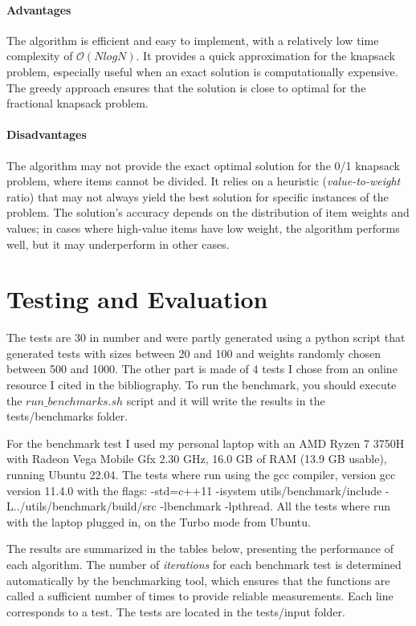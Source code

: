 \documentclass{llncs}
\begin{document}
\paragraph{Advantages}
The algorithm is efficient and easy to implement, with a relatively low time complexity of 
$\mathcal{O}(NlogN)$. It provides a quick approximation for the knapsack problem, especially useful
when an exact solution is computationally expensive. The greedy approach ensures that the solution
is close to optimal for the fractional knapsack problem.

\paragraph{Disadvantages}
The algorithm may not provide the exact optimal solution for the 0/1 knapsack problem, where items
cannot be divided. It relies on a heuristic (\textit{value-to-weight} ratio) that may not always
yield the best solution for specific instances of the problem. The solution's accuracy depends on 
the distribution of item weights and values; in cases where high-value items have low weight, the 
algorithm performs well, but it may underperform in other cases.

\section{Testing and Evaluation}
The tests are 30 in number and were partly generated using a python script that generated tests with
sizes between 20 and 100 and weights randomly chosen between 500 and 1000. The other part is made of
4 tests I chose from an online resource I cited in the bibliography. To run the benchmark, you should
execute the $run\_benchmarks.sh$ script and it will write the results in the 
tests/benchmarks folder.

For the benchmark test I used my personal laptop with an AMD Ryzen 7 3750H with Radeon Vega Mobile
Gfx 2.30 GHz, 16.0 GB of RAM (13.9 GB usable), running Ubuntu 22.04. The tests where run using the
gcc compiler, version gcc version 11.4.0 with the flags: -std=c++11 -isystem utils/benchmark/include 
-L../utils/benchmark/build/src -lbenchmark -lpthread. All the tests where run with the laptop plugged
in, on the Turbo mode from Ubuntu.

The results are summarized in the tables below, presenting the performance of each algorithm. The 
number of \textit{iterations} for each benchmark test is determined automatically by the 
benchmarking tool, which ensures that the functions are called a sufficient number of times to 
provide reliable measurements. Each line corresponds to a test. The tests are located in the tests/input folder.
\end{document}
